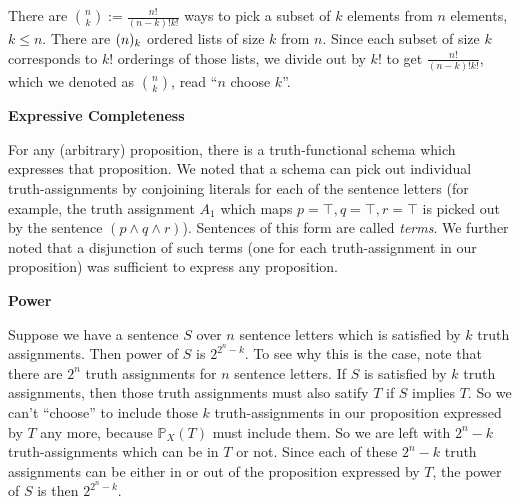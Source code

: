 \begin{mdframed}[linewidth=1]
There are $\binom{n}{k} := \frac{n!}{(n-k)!k!}$ ways to pick a subset of $k$ elements from $n$ elements, $k \leq n$. There are $\mbox{$(n)_{k}$}$ ordered lists of size $k$ from $n$. Since each subset of size $k$ corresponds to $k!$ orderings of those lists, we divide out by $k!$ to get $\frac{n!}{(n-k)!k!}$, which we denoted as $\binom{n}{k}$, read ``$n$ choose $k$''. 

\textbf{Expressive Completeness}

For any (arbitrary) proposition, there is a truth-functional schema which expresses that proposition. We noted that a schema can pick out individual truth-assignments by conjoining literals for each of the sentence letters (for example, the truth assignment $A_1$ which maps $p = \top, q = \top, r = \top$ is picked out by the sentence $(p \land q \land r)$). Sentences of this form are called \emph{terms}. We further noted that a disjunction of such terms (one for each truth-assignment in our proposition) was sufficient to express any proposition. 

\textbf{Power}

Suppose we have a sentence $S$ over $n$ sentence letters which is satisfied by $k$ truth assignments. Then power of $S$ is $2^{2^n - k}$. To see why this is the case, note that there are $2^n$ truth assignments for $n$ sentence letters. If $S$ is satisfied by $k$ truth assignments, then those truth assignments must also satify $T$ if $S$ implies $T$. So we can't ``choose'' to include those $k$ truth-assignments in our proposition expressed by $T$ any more, because $\mathbb{P}_X(T)$ must include them. So we are left with $2^n - k$ truth-assignments which can be in $T$ or not. Since each of these $2^n - k$ truth assignments can be either in or out of the proposition expressed by $T$, the power of $S$ is then $2^{2^n - k}$.
\end{mdframed}

